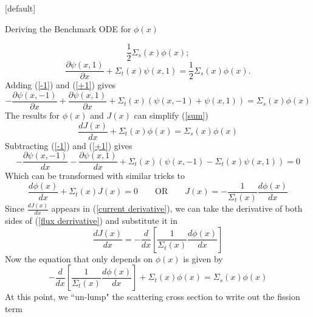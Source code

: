 \documentclass[9pt,t,aspectratio=169]{beamer}
\makeatletter
\newcommand{\QOR}{\qquad \text{OR} \qquad}
\newenvironment{withoutheadline}{
       \setbeamertemplate{headline}[default]
       \def\beamer@entrycode{\vspace*{-\headheight}}
    }{}
\makeatother
\begin{document}
\begin{withoutheadline}
\begin{frame}[allowframebreaks]{Deriving the Benchmark ODE for $\phi(x)$}
\begin{itemize}
\begin{equation}
            \frac{1}{2}\Sigma_{s}(x) \phi(x);
        \end{equation}
        \begin{equation} \label{+1}
            \frac{\partial \psi(x,1)}{\partial x} + \Sigma_{t}(x)\psi(x,1) =
            \frac{1}{2}\Sigma_{s}(x) \phi(x).
        \end{equation}
        Adding (\ref{-1}) and (\ref{+1}) gives
        \begin{equation}\label{sum}
            -\frac{\partial \psi(x,-1)}{\partial x} + \frac{\partial \psi(x,1)}{\partial x} + \Sigma_{t}(x)\left(\psi(x,-1) + \psi(x,1) \right) =
            \Sigma_{s}(x) \phi(x)
        \end{equation}
        The results for $\phi(x)$ and $J(x)$ can simplify (\ref{sum})
        \begin{equation}  \label{current derivative}
            \frac{dJ(x)}{ dx} + \Sigma_{t}(x)\phi(x) =
            \Sigma_{s}(x) \phi(x)
        \end{equation}
        Subtracting  (\ref{-1}) and (\ref{+1}) gives
        \begin{equation}
            -\frac{\partial \psi(x,-1)}{dx}
            - \frac{\partial \psi(x,1)}{d x} + \Sigma_{t}(x)\left(\psi(x,-1)  - \Sigma_{t}(x)\psi(x,1)\right) =
            0
        \end{equation}
        Which can be transformed with similar tricks to
        \begin{equation} \label{flux derrivative}
            \frac{d\phi(x)}{dx} + \Sigma_{t}(x)J(x) = 0 \QOR
            J(x) = - \frac{1}{\Sigma_{t}(x)} \frac{d\phi(x)}{dx}
        \end{equation}
        Since $\frac{dJ(x)}{dx}$ appears in (\ref{current derivative}), we can take the derivative of both sides of (\ref{flux derrivative}) and substitute it in
        \begin{equation}
          \frac{dJ(x)}{dx} =
          - \frac{d}{dx} \left\lbrack \frac{1}{\Sigma_{t}(x)} \frac{d\phi(x)}{dx} \right\rbrack
        \end{equation}
        Now the equation that only depends on $\phi(x)$ is given by
        \begin{equation}
            -\frac{d}{dx}\left\lbrack\frac{1}{\Sigma_{t}(x)} \frac{d\phi(x)}{dx} \right\rbrack + \Sigma_{t}(x)\phi(x) =
            \Sigma_{s}(x) \phi(x)
        \end{equation}
        At this point, we ``un-lump" the scattering cross section to write out the fission term
        \begin{equation}

\end{equation}
\end{itemize}
\end{frame}
\end{withoutheadline}
\end{document}
